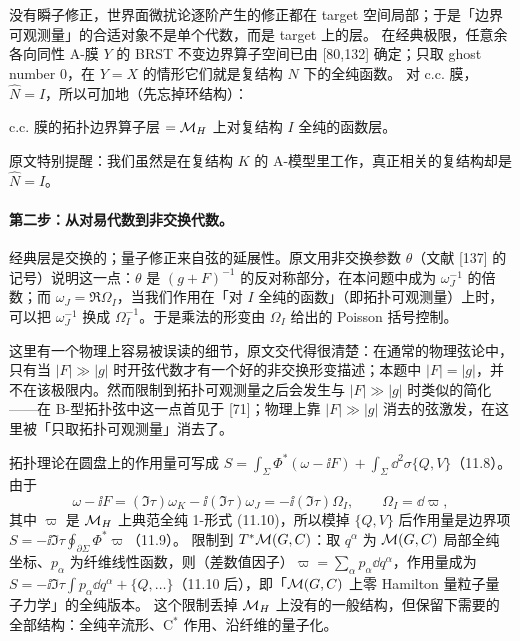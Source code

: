 没有瞬子修正，世界面微扰论逐阶产生的修正都在 target 空间局部；于是「边界可观测量」的合适对象不是单个代数，而是 target 上的层。\pA{} 在经典极限，任意余各向同性 A-膜 \(Y\) 的 BRST 不变边界算子空间已由 [80,132] 确定；只取 ghost number 0，在 \(Y=X\) 的情形它们就是复结构 \(\hat N\) 下的全纯函数。\pA{} 对 c.c. 膜，\(\hat N=I\)，所以可加地（先忘掉环结构）：
\begin{keyidea}
c.c. 膜的拓扑边界算子层 \(=\mathcal{M}_H\) 上对复结构 \(I\) 全纯的函数层。
\end{keyidea}
\noindent 原文特别提醒：我们虽然是在复结构 \(K\) 的 A-模型里工作，真正相关的复结构却是 \(\hat N=I\)。\pA{}

\paragraph{第二步：从对易代数到非交换代数。}经典层是交换的；量子修正来自弦的延展性。原文用非交换参数 \(\theta\)（文献 [137] 的记号）说明这一点：\(\theta\) 是 \((g+F)^{-1}\) 的反对称部分，在本问题中成为 \(\omega_J^{-1}\) 的倍数；而 \(\omega_J=\Re\Omega_I\)，当我们作用在「对 \(I\) 全纯的函数」（即拓扑可观测量）上时，可以把 \(\omega_J^{-1}\) 换成 \(\Omega_I^{-1}\)。于是乘法的形变由 \(\Omega_I\) 给出的 Poisson 括号控制。\pA{}

这里有一个物理上容易被误读的细节，原文交代得很清楚：在通常的物理弦论中，只有当 \(|F|\gg|g|\) 时开弦代数才有一个好的非交换形变描述；本题中 \(|F|=|g|\)，并不在该极限内。然而限制到拓扑可观测量之后会发生与 \(|F|\gg|g|\) 时类似的简化——在 B-型拓扑弦中这一点首见于 [71]；物理上靠 \(|F|\gg|g|\) 消去的弦激发，在这里被「只取拓扑可观测量」消去了。\pA{}

拓扑理论在圆盘上的作用量可写成 \(S=\int_\Sigma\Phi^*(\omega-\ii F)+\int_\Sigma\dd^2\sigma\{Q,V\}\)（11.8）。由于
\begin{equation}
\omega-\ii F=(\Im\tau)\omega_K-\ii(\Im\tau)\omega_J=-\ii(\Im\tau)\Omega_I,\qquad \Omega_I=\dd\varpi,
\label{eq:S-theta}
\end{equation}
其中 \(\varpi\) 是 \(\mathcal{M}_H\) 上典范全纯 1-形式 (11.10)，所以模掉 \(\{Q,V\}\) 后作用量是边界项 \(S=-\ii\Im\tau\oint_{\partial\Sigma}\Phi^*\varpi\)（11.9）。\pA{}\pA{} 限制到 \(T^*\mathcal{M}(G,C)\)：取 \(q^\alpha\) 为 \(\mathcal{M}(G,C)\) 局部全纯坐标、\(p_\alpha\) 为纤维线性函数，则（差数值因子）\(\varpi=\sum_\alpha p_\alpha\dd q^\alpha\)，作用量成为 \(S=-\ii\Im\tau\int p_\alpha\dd q^\alpha+\{Q,\dots\}\)（11.10 后），即「\(\mathcal{M}(G,C)\) 上零 Hamilton 量粒子量子力学」的全纯版本。\pA{} 这个限制丢掉 \(\mathcal{M}_H\) 上没有的一般结构，但保留下需要的全部结构：全纯辛流形、C$^*$ 作用、沿纤维的量子化。

